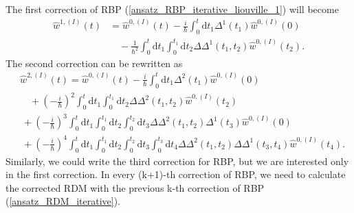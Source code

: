 The first correction of RBP (\ref{ansatz_RBP_iterative_liouville_1}) will become
\begin{equation}
\label{ansatz_RBP_iterative_Delta_1}
    \begin{aligned}
    \hat{w}^{1,(I)}(t) &= \hat{w}^{0, (I)}(t) - \frac{i}{\hbar}\int_{0}^{t} \mathrm{d} t_1 \Delta^{1}(t_1) \hat{w}^{0, (I)}(0) \\
     &\quad -\frac{1}{\hbar^2} \int_{0}^{t} \mathrm{d} t_1 \int_{0}^{t_1} \mathrm{d} t_2 \Delta\Delta^{1}(t_1, t_2) \hat{w}^{0, (I)}(t_2) .
    \end{aligned}
\end{equation}
The second correction can be rewritten as 
\begin{equation}
\label{ansatz_RBP_iterative_Delta_2}
    \begin{aligned}
    &\hat{w}^{2,(I)}(t) = \hat{w}^{0, (I)}(t) - \frac{i}{\hbar}\int_{0}^{t} \mathrm{d} t_1 \Delta^{2}(t_1) \hat{w}^{0, (I)}(0) \\
     &\quad +\left(-\frac{i}{\hbar}\right)^2 \int_{0}^{t} \mathrm{d} t_1 \int_{0}^{t_1} \mathrm{d} t_2 \Delta\Delta^{2}(t_1, t_2) \hat{w}^{0, (I)}(t_2) \\
     &\: +\left(-\frac{i}{\hbar}\right)^3 \int_{0}^{t} \mathrm{d} t_1 \int_{0}^{t_1} \mathrm{d} t_2 \int_{0}^{t_2} \mathrm{d} t_3 \Delta\Delta^{2}(t_1, t_2) \Delta^{1}(t_3) \hat{w}^{0, (I)}(0) \\
     &\: +\left(-\frac{i}{\hbar}\right)^4 \int_{0}^{t} \mathrm{d} t_1 \int_{0}^{t_1} \mathrm{d} t_2 \int_{0}^{t_2} \mathrm{d} t_3 \int_{0}^{t_3} \mathrm{d} t_4 \Delta\Delta^{2}(t_1, t_2) \Delta\Delta^{1}(t_3, t_4) \hat{w}^{0, (I)}(t_4).
    \end{aligned}
\end{equation}
Similarly, we could write the third correction for RBP, but we are interested only in the first correction. In every (k+1)-th correction of RBP, we need to calculate the corrected RDM with the previous k-th correction of RBP (\ref{ansatz_RDM_iterative}).

